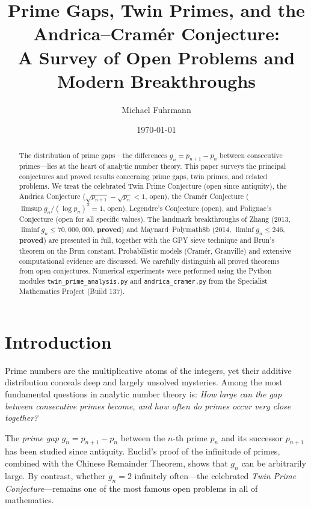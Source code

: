\documentclass[12pt,a4paper]{amsart}
\author{Michael Fuhrmann}
\date{\today}
\title{Prime Gaps, Twin Primes, and the Andrica--Cram\'{e}r Conjecture:\\
A Survey of Open Problems and Modern Breakthroughs}
\theoremstyle{definition}
\begin{document}
\begin{abstract}
The distribution of prime gaps---the differences $g_n = p_{n+1} - p_n$ between
consecutive primes---lies at the heart of analytic number theory. This paper
surveys the principal conjectures and proved results concerning prime gaps, twin
primes, and related problems. We treat the celebrated Twin Prime Conjecture
(open since antiquity), the Andrica Conjecture ($\sqrt{p_{n+1}} - \sqrt{p_n} < 1$,
open), the Cramér Conjecture ($\limsup g_n/(\log p_n)^2 = 1$, open), Legendre's
Conjecture (open), and Polignac's Conjecture (open for all specific values).
The landmark breakthroughs of Zhang (2013, $\liminf g_n \le 70{,}000{,}000$,
\textbf{proved}) and Maynard--Polymath8b (2014, $\liminf g_n \le 246$,
\textbf{proved}) are presented in full, together with the GPY sieve technique
and Brun's theorem on the Brun constant. Probabilistic models (Cramér, Granville)
and extensive computational evidence are discussed. We carefully distinguish all
proved theorems from open conjectures. Numerical experiments were performed
using the Python modules \texttt{twin\_prime\_analysis.py} and
\texttt{andrica\_cramer.py} from the Specialist Mathematics Project (Build 137).
\end{abstract}

\maketitle
\tableofcontents

\section{Introduction}

Prime numbers are the multiplicative atoms of the integers, yet their additive
distribution conceals deep and largely unsolved mysteries. Among the most
fundamental questions in analytic number theory is: \emph{How large can the gap
between consecutive primes become, and how often do primes occur very close
together?}

The \emph{prime gap} $g_n = p_{n+1} - p_n$ between the $n$-th prime $p_n$ and
its successor $p_{n+1}$ has been studied since antiquity. Euclid's proof of the
infinitude of primes, combined with the Chinese Remainder Theorem, shows that
$g_n$ can be arbitrarily large. By contrast, whether $g_n = 2$ infinitely
often---the celebrated \emph{Twin Prime Conjecture}---remains one of the most
famous open problems in all of mathematics.
\end{document}
